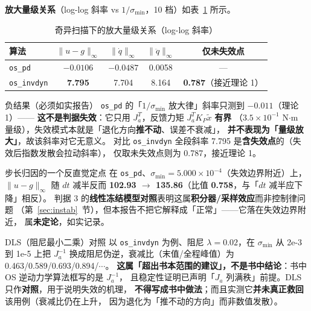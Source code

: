 \documentclass[11pt,a4paper]{ctexart}
\begin{document}
\textbf{放大量级关系}（log-log 斜率 vs $1/\sigma_{\min}$，10 档）如表~\ref{tab:scaling} 所示。

\begin{table}[H]
\centering
\small
\caption{奇异扫描下的放大量级关系（log-log 斜率）}\label{tab:scaling}
\begin{tabular}{@{}lcccc@{}}
\toprule
算法 & $\|u-g\|_\infty$ & $\|\dot q\|_\infty$ & $\|\ddot q\|_\infty$ & 仅未失效点 \\
\midrule
\texttt{os\_pd} & \textbf{$-0.0106$} & $-0.0487$ & 0.0058 & --- \\
\texttt{os\_invdyn} & \textbf{7.795} & 7.704 & 8.164 & \textbf{0.787}（接近理论 1） \\
\bottomrule
\end{tabular}
\end{table}

\begin{warnbox}{负结果（必须如实报告）}
\texttt{os\_pd} 的「$1/\sigma_{\min}$ 放大律」斜率只测到 \textbf{$-0.011$}（理论 1）——
\textbf{这不是判据失效}：它只用 $J_a^{T}$，反馈力矩 $J_a^{T}K_P\tilde x$ \textbf{有界}
（$3.5\times10^{-1}$ N$\cdot$m 量级），失效模式本就是「退化方向\textbf{推不动}、误差不衰减」，
\textbf{并不表现为「量级放大」}，故该斜率对它无意义。
对比 \texttt{os\_invdyn} 全段斜率 7.795 是\textbf{含失效点}的（失效后指数发散会拉动斜率），
仅取未失效点则为 0.787，接近理论 1。
\end{warnbox}

\begin{warnbox}{步长归因的一个反直觉定点}
在 \texttt{os\_pd}、$\sigma_{\min}=5.000\times10^{-4}$（失效边界附近）上，$\|u-g\|_\infty$ 随 $dt$
减半反而 \textbf{102.93 $\to$ 135.86}（比值 \textbf{0.758}，与「$dt$ 减半应下降」相反）。
判据 3 的\textbf{线性冻结模型对照}表明这属\textbf{积分器/采样效应}而非控制律问题
（第~\ref{sec:instab}~节），但本报告不把它解释成「正常」——它落在失效边界附近，
属\textbf{未定论}，如实记录。
\end{warnbox}

\begin{warnbox}{DLS（阻尼最小二乘）对照}
以 \texttt{os\_invdyn} 为例、阻尼 $\lambda=0.02$，在 $\sigma_{\min}$ 从 2e-3 到 1e-5 上把
$J_a^{-1}$ 换成阻尼伪逆，衰减比（末值/全程峰值）为 0.463/0.589/0.693/0.894/$\cdots$。
\textbf{这属「超出书本范围的建议」，不是书中结论}：书中 OS 逆动力学算法框写的是 $J_a^{-1}$，
且稳定性证明已声明「$J_a$ 列满秩」前提。DLS 只作\textbf{对照}，用于说明失效的机理，
\textbf{不得写成书中做法}；而且实测它\textbf{并未真正救回}该用例（衰减比仍在上升，
因为退化为「推不动的方向」而非数值发散）。
\end{warnbox}
\end{document}
